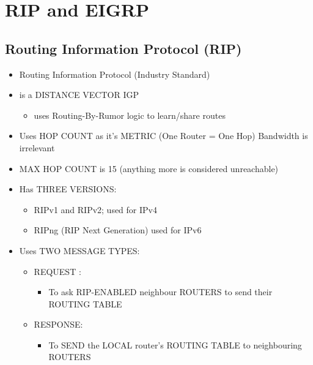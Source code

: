 \chapter{RIP and EIGRP}\label{rip-and-eigrp}

\section{Routing Information Protocol
(RIP)}\label{routing-information-protocol-rip}

\begin{itemize}
\tightlist
\item
  Routing Information Protocol (Industry Standard)
\item
  is a DISTANCE VECTOR IGP

  \begin{itemize}
  \tightlist
  \item
    uses Routing-By-Rumor logic to learn/share routes
  \end{itemize}
\item
  Uses HOP COUNT as it's METRIC (One Router = One Hop) Bandwidth is
  irrelevant
\item
  MAX HOP COUNT is 15 (anything more is considered unreachable)
\item
  Has THREE VERSIONS:

  \begin{itemize}
  \tightlist
  \item
    RIPv1 and RIPv2; used for IPv4
  \item
    RIPng (RIP Next Generation) used for IPv6
  \end{itemize}
\item
  Uses TWO MESSAGE TYPES:

  \begin{itemize}
  \tightlist
  \item
    REQUEST :

    \begin{itemize}
    \tightlist
    \item
      To ask RIP-ENABLED neighbour ROUTERS to send their ROUTING TABLE
    \end{itemize}
  \item
    RESPONSE:

    \begin{itemize}
    \tightlist
    \item
      To SEND the LOCAL router's ROUTING TABLE to neighbouring ROUTERS
    \end{itemize}
  \end{itemize}
\end{itemize}

